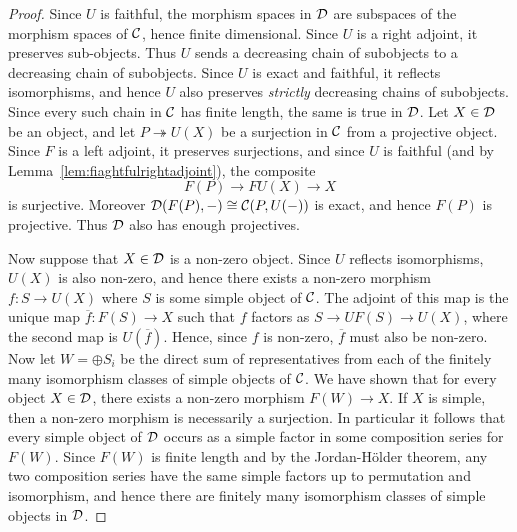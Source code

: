 \documentclass{amsart}
\begin{document}
\begin{proof}
	Since $U$ is faithful, the morphism spaces in $\mathcal D$ are subspaces of the morphism spaces of $\mathcal C$, hence finite dimensional. Since $U$ is a right adjoint, it preserves sub-objects. Thus $U$ sends a decreasing chain of  subobjects to a decreasing chain of subobjects. Since $U$ is exact and faithful, it reflects isomorphisms, and hence $U$ also preserves {\em strictly} decreasing chains of subobjects. Since every such chain in $\mathcal C$ has finite length, the same is true in $\mathcal D$. Let $X \in \mathcal D$ be an object, and let $P \twoheadrightarrow U(X)$ be a surjection in $\mathcal C$ from a projective object. Since $F$ is a left adjoint, it preserves surjections, and since $U$ is faithful (and by Lemma~\ref{lem:fiaghtfulrightadjoint}), the composite
	\begin{equation*}
		F(P) \to FU(X) \to X
	\end{equation*}
	is surjective. Moreover $\mathcal D(F(P), -) \cong \mathcal C(P, U(-))$ is exact, and hence $F(P)$ is projective. Thus $\mathcal D$ also has enough projectives. 
	
Now suppose that $X \in \mathcal D$ is a non-zero object. Since $U$ reflects isomorphisms, $U(X)$ is also non-zero, and hence there exists a non-zero morphism $f: S \to U(X)$ where $S$ is some simple object of $\mathcal C$. The adjoint of this map is the unique map $\overline{f}: F(S) \to X$ such that $f$ factors as $S \to UF(S) \to U(X)$, where the second map is $U(\overline{f})$. Hence, since $f$ is non-zero, $\overline{f}$ must also be non-zero.  Now let $W = \oplus S_i$ be the direct sum of representatives from each of the finitely many isomorphism classes of simple objects of $\mathcal C$. We have shown that for every object $X \in \mathcal D$, there exists a non-zero morphism $F(W) \to X$. If $X$ is simple, then a non-zero morphism is necessarily a surjection. In particular it follows that every simple object of $\mathcal D$ occurs as a simple factor in some composition series for $F(W)$. Since $F(W)$ is finite length and by the Jordan-H\"older theorem, any two composition series have the same simple factors up to permutation and isomorphism, and hence there are finitely many isomorphism classes of simple objects in $\mathcal D$.  
\end{proof}
\end{document}
